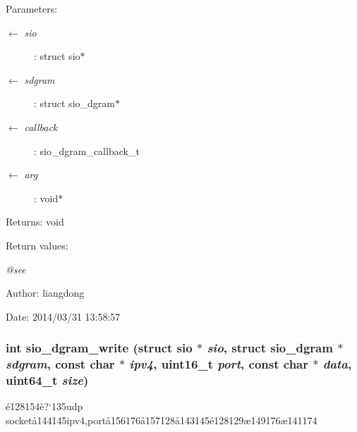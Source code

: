 \begin{Desc}
\item[Parameters:]
\begin{description}
\item[\mbox{$\leftarrow$} {\em sio}]: struct sio$\ast$ \item[\mbox{$\leftarrow$} {\em sdgram}]: struct sio\_\-dgram$\ast$ \item[\mbox{$\leftarrow$} {\em callback}]: sio\_\-dgram\_\-callback\_\-t \item[\mbox{$\leftarrow$} {\em arg}]: void$\ast$ \end{description}
\end{Desc}
\begin{Desc}
\item[Returns:]void \end{Desc}
\begin{Desc}
\item[Return values:]
\begin{description}
\item[{\em @see}]\end{description}
\end{Desc}
\begin{Desc}
\item[Author:]liangdong \end{Desc}
\begin{Desc}
\item[Date:]2014/03/31 13:58:57 \end{Desc}
\subsubsection{\setlength{\rightskip}{0pt plus 5cm}int sio\_\-dgram\_\-write (struct sio $\ast$ {\em sio}, struct sio\_\-dgram $\ast$ {\em sdgram}, const char $\ast$ {\em ipv4}, uint16\_\-t {\em port}, const char $\ast$ {\em data}, uint64\_\-t {\em size})}\label{sio__dgram_8h_a3}


\'{e}128154\`{e}?`135udp socket\aa{}144145ipv4,port\aa{}156176\aa{}157128\aa{}143145\'{e}128129\ae{}149176\ae{}141174 


